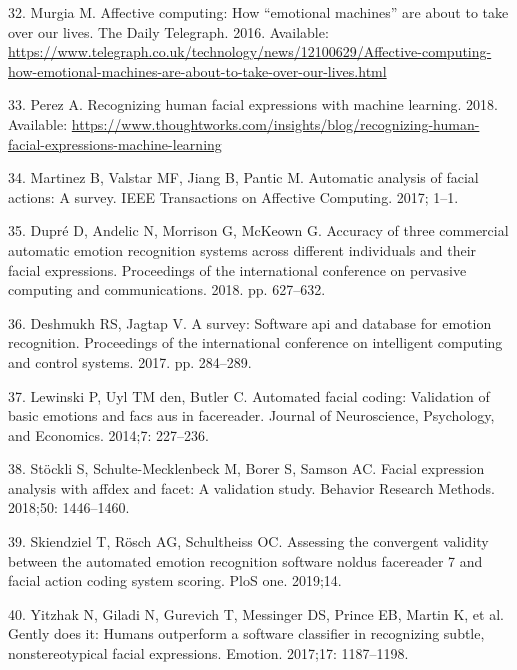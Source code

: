 \documentclass[10pt,letterpaper]{article}
\begin{document}
\leavevmode\hypertarget{ref-murgia2019affective}{}%
32. Murgia M. Affective computing: How ``emotional machines'' are about to take over our lives. The Daily Telegraph. 2016. Available: \url{https://www.telegraph.co.uk/technology/news/12100629/Affective-computing-how-emotional-machines-are-about-to-take-over-our-lives.html}

\leavevmode\hypertarget{ref-perez2019recognizing}{}%
33. Perez A. Recognizing human facial expressions with machine learning. 2018. Available: \url{https://www.thoughtworks.com/insights/blog/recognizing-human-facial-expressions-machine-learning}

\leavevmode\hypertarget{ref-martinez2017automatic}{}%
34. Martinez B, Valstar MF, Jiang B, Pantic M. Automatic analysis of facial actions: A survey. IEEE Transactions on Affective Computing. 2017; 1--1.

\leavevmode\hypertarget{ref-dupre2018accuracy}{}%
35. Dupré D, Andelic N, Morrison G, McKeown G. Accuracy of three commercial automatic emotion recognition systems across different individuals and their facial expressions. Proceedings of the international conference on pervasive computing and communications. 2018. pp. 627--632.

\leavevmode\hypertarget{ref-deshmukh2017survey}{}%
36. Deshmukh RS, Jagtap V. A survey: Software api and database for emotion recognition. Proceedings of the international conference on intelligent computing and control systems. 2017. pp. 284--289.

\leavevmode\hypertarget{ref-lewinski2014automated}{}%
37. Lewinski P, Uyl TM den, Butler C. Automated facial coding: Validation of basic emotions and facs aus in facereader. Journal of Neuroscience, Psychology, and Economics. 2014;7: 227--236.

\leavevmode\hypertarget{ref-stockli2018facial}{}%
38. Stöckli S, Schulte-Mecklenbeck M, Borer S, Samson AC. Facial expression analysis with affdex and facet: A validation study. Behavior Research Methods. 2018;50: 1446--1460.

\leavevmode\hypertarget{ref-skiendziel2019assessing}{}%
39. Skiendziel T, Rösch AG, Schultheiss OC. Assessing the convergent validity between the automated emotion recognition software noldus facereader 7 and facial action coding system scoring. PloS one. 2019;14.

\leavevmode\hypertarget{ref-yitzhak2017gently}{}%
40. Yitzhak N, Giladi N, Gurevich T, Messinger DS, Prince EB, Martin K, et al. Gently does it: Humans outperform a software classifier in recognizing subtle, nonstereotypical facial expressions. Emotion. 2017;17: 1187--1198.
\end{document}
